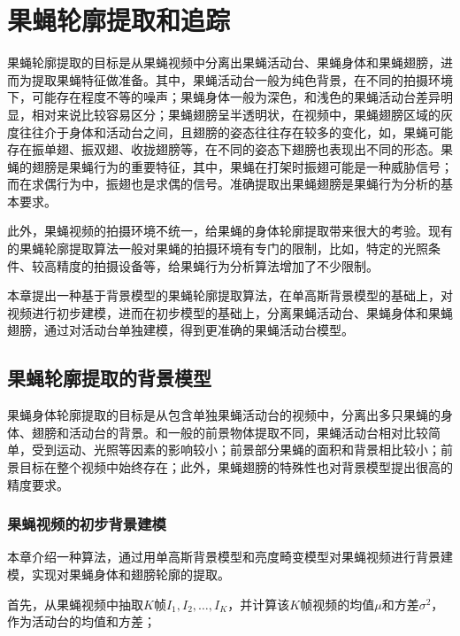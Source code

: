 \chapter{果蝇轮廓提取和追踪} \label{chapter:fly_contour}

果蝇轮廓提取的目标是从果蝇视频中分离出果蝇活动台、果蝇身体和果蝇翅膀，进而为提取果蝇特征做准备。其中，果蝇活动台一般为纯色背景，在不同的拍摄环境下，可能存在程度不等的噪声；果蝇身体一般为深色，和浅色的果蝇活动台差异明显，相对来说比较容易区分；果蝇翅膀呈半透明状，在视频中，果蝇翅膀区域的灰度往往介于身体和活动台之间，且翅膀的姿态往往存在较多的变化，如，果蝇可能存在振单翅、振双翅、收拢翅膀等，在不同的姿态下翅膀也表现出不同的形态。果蝇的翅膀是果蝇行为的重要特征，其中，果蝇在打架时振翅可能是一种威胁信号；而在求偶行为中，振翅也是求偶的信号。准确提取出果蝇翅膀是果蝇行为分析的基本要求。

此外，果蝇视频的拍摄环境不统一，给果蝇的身体轮廓提取带来很大的考验。现有的果蝇轮廓提取算法一般对果蝇的拍摄环境有专门的限制，比如，特定的光照条件、较高精度的拍摄设备等，给果蝇行为分析算法增加了不少限制。

本章提出一种基于背景模型的果蝇轮廓提取算法，在单高斯背景模型的基础上，对视频进行初步建模，进而在初步模型的基础上，分离果蝇活动台、果蝇身体和果蝇翅膀，通过对活动台单独建模，得到更准确的果蝇活动台模型。

\section{果蝇轮廓提取的背景模型}

果蝇身体轮廓提取的目标是从包含单独果蝇活动台的视频中，分离出多只果蝇的身体、翅膀和活动台的背景。和一般的前景物体提取不同，果蝇活动台相对比较简单，受到运动、光照等因素的影响较小；前景部分果蝇的面积和背景相比较小；前景目标在整个视频中始终存在；此外，果蝇翅膀的特殊性也对背景模型提出很高的精度要求。

\subsection{果蝇视频的初步背景建模}\label{sec:fly_bg_model_basic}

本章介绍一种算法，通过用单高斯背景模型和亮度畸变模型对果蝇视频进行背景建模，实现对果蝇身体和翅膀轮廓的提取。

首先，从果蝇视频中抽取$K$帧$I_{1}, I_{2}, \ldots, I_{K}$，并计算该$K$帧视频的均值$\mu$和方差$\sigma^2$，作为活动台的均值和方差；

